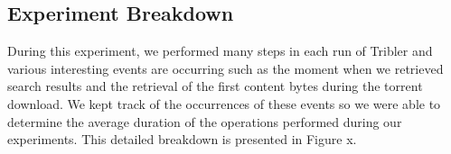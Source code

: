 \subsection{Experiment Breakdown}
During this experiment, we performed many steps in each run of Tribler and various interesting events are occurring such as the moment when we retrieved search results and the retrieval of the first content bytes during the torrent download. We kept track of the occurrences of these events so we were able to determine the average duration of the operations performed during our experiments. This detailed breakdown is presented in Figure x.